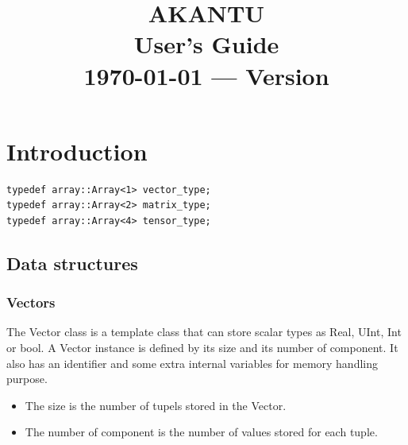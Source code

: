 \documentclass[a4paper,11pt]{book}
\title{\textbf{\Huge AKANTU}\\
  \vspace{0.5cm}
  \textbf{\huge User's Guide}\\
  \vspace{1cm}
  {\small \today{} --- Version \version}
}
\date{}
\newcommand{\code}[1]{{\tt{#1}}}
\begin{document}
\maketitle

\tableofcontents

\chapter{Introduction}

\begin{lstlisting}[caption={ \code{Array} class template}, label=lst:array]
typedef array::Array<1> vector_type;
typedef array::Array<2> matrix_type;
typedef array::Array<4> tensor_type;
\end{lstlisting}


\section{Data structures\label{chap:data-structure}}

\subsection{Vectors\label{sec:vectors}}

The Vector class is a template class  that can store scalar types as Real, UInt,
Int  or bool.   A Vector  instance is  defined  by its  size and  its number  of
component.  It also  has an  identifier and  some extra  internal  variables for
memory handling purpose.

\begin{itemize}
\item The size is the number of tupels stored in the Vector.
\item The number of component is the number of values stored for each tuple.
\end{itemize}
\end{document}
